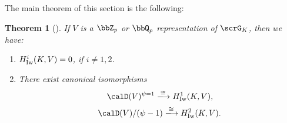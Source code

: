 \documentclass[a4paper,oneside]{amsart}
\newtheorem{theorem}{Theorem}[section]
\numberwithin{equation}{section}
\numberwithin{figure}{section}
\begin{document}
The main theorem of this section is the following:
\begin{theorem}[{\cite[Th\'eor\`eme II.1.3, Remarque II.3.2]{cherbonnier_theorie_1999}}]\label{thm:15019}
    If $V$ is a $\bbZ_p$ or $\bbQ_p$ representation of $\scrG_K$, then we have:
    \begin{enumerate}
        \item $H^i_{\operatorname{Iw}}(K,V)=0$, if $i\neq 1,2$.
        \item There exist canonical isomorphisms
              \begin{equation}\label{eq:43260}
                  \calD(V)^{\psi=1}\xlto{\cong}H^1_{\opn{Iw}}(K,V),
              \end{equation}
              $$\calD(V)/(\psi-1)\xlto{\cong}H^2_{\opn{Iw}}(K,V).$$
    \end{enumerate}
\end{theorem}
\end{document}
